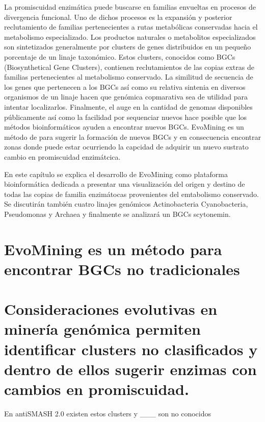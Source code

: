 \documentclass[12pt,twoside]{reedthesis}
\begin{document}
  La promiscuidad enzimática puede buscarse en familias envueltas en
  procesos de divergencia funcional. Uno de dichos procesos es la
  expansión y posterior reclutamiento de familias pertenecientes a rutas
  metabólicas conservadas hacia el metabolismo especializado. Los
  productos naturales o metabolitos especializados son sintetizados
  generalmente por clusters de genes distribuidos en un pequeño porcentaje
  de un linaje taxonómico. Estos clusters, conocidos como BGCs
  (Biosynthetical Gene Clusters), contienen reclutamientos de las copias
  extras de familias pertenecientes al metabolismo conservado. La
  similitud de secuencia de los genes que pertenecen a los BGCs así como
  su relativa sintenia en diversos organismos de un linaje hacen que
  genómica copmarativa sea de utilidad para intentar localizarlos.
  Finalmente, el auge en la cantidad de genomas disponibles públicamente
  así como la facilidad por sequenciar nuevos hace posible que los métodos
  bioinformáticos ayuden a encontrar nuevos BGCs. EvoMining es un método
  de para sugerir la formación de nuevos BGCs y en consecuencia encontrar
  zonas donde puede estar ocurriendo la capcidad de adquirir un nuevo
  sustrato cambio en promiscuidad enzimátcica.
  
  En este capítulo se explica el desarrollo de EvoMining como plataforma
  bioinformática dedicada a presentar una visualización del origen y
  destino de todas las copias de familia enzimátocas provenientes del
  emtabolismo conservado. Se discutirán también cuatro linajes genómicos
  Actinobacteria Cyanobacteria, Pseudomonas y Archaea y finalmente se
  analizará un BGCs scytonemin.
  
  \section{EvoMining es un método para encontrar BGCs no
  tradicionales}\label{evomining-es-un-metodo-para-encontrar-bgcs-no-tradicionales}
  
  \section{Consideraciones evolutivas en minería genómica permiten
  identificar clusters no clasificados y dentro de ellos sugerir enzimas
  con cambios en
  promiscuidad.}\label{consideraciones-evolutivas-en-mineria-genomica-permiten-identificar-clusters-no-clasificados-y-dentro-de-ellos-sugerir-enzimas-con-cambios-en-promiscuidad.}
  
  En antiSMASH 2.0 existen estos clusters y \_\_\_ son no conocidos
  
\end{document}
